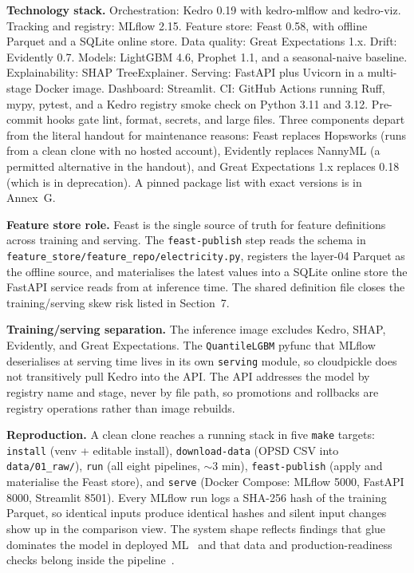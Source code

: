 \documentclass[11pt,a4paper]{article}
\newcommand{\code}[1]{\texttt{\small #1}}
\begin{document}
\textbf{Technology stack.} Orchestration: Kedro 0.19 with kedro-mlflow and kedro-viz. Tracking and registry: MLflow 2.15. Feature store: Feast 0.58, with offline Parquet and a SQLite online store. Data quality: Great Expectations 1.x. Drift: Evidently 0.7. Models: LightGBM 4.6, Prophet 1.1, and a seasonal-naive baseline. Explainability: SHAP TreeExplainer. Serving: FastAPI plus Uvicorn in a multi-stage Docker image. Dashboard: Streamlit. CI: GitHub Actions running Ruff, mypy, pytest, and a Kedro registry smoke check on Python 3.11 and 3.12. Pre-commit hooks gate lint, format, secrets, and large files. Three components depart from the literal handout for maintenance reasons: Feast replaces Hopsworks (runs from a clean clone with no hosted account), Evidently replaces NannyML (a permitted alternative in the handout), and Great Expectations 1.x replaces 0.18 (which is in deprecation). A pinned package list with exact versions is in Annex~G.

\textbf{Feature store role.} Feast is the single source of truth for feature definitions across training and serving. The \code{feast-publish} step reads the schema in \code{feature\_store/feature\_repo/electricity.py}, registers the layer-04 Parquet as the offline source, and materialises the latest values into a SQLite online store the FastAPI service reads from at inference time. The shared definition file closes the training/serving skew risk listed in Section~7.

\textbf{Training/serving separation.} The inference image excludes Kedro, SHAP, Evidently, and Great Expectations. The \code{QuantileLGBM} pyfunc that MLflow deserialises at serving time lives in its own \code{serving} module, so cloudpickle does not transitively pull Kedro into the API. The API addresses the model by registry name and stage, never by file path, so promotions and rollbacks are registry operations rather than image rebuilds.

\textbf{Reproduction.} A clean clone reaches a running stack in five \code{make} targets: \code{install} (venv + editable install), \code{download-data} (OPSD CSV into \code{data/01\_raw/}), \code{run} (all eight pipelines, $\sim$3 min), \code{feast-publish} (apply and materialise the Feast store), and \code{serve} (Docker Compose: MLflow 5000, FastAPI 8000, Streamlit 8501). Every MLflow run logs a SHA-256 hash of the training Parquet, so identical inputs produce identical hashes and silent input changes show up in the comparison view. The system shape reflects findings that glue dominates the model in deployed ML~\cite{sculley2015hidden, paleyes2022challenges} and that data and production-readiness checks belong inside the pipeline~\cite{schelter2018datavalidation, breck2017tests}.
\end{document}

